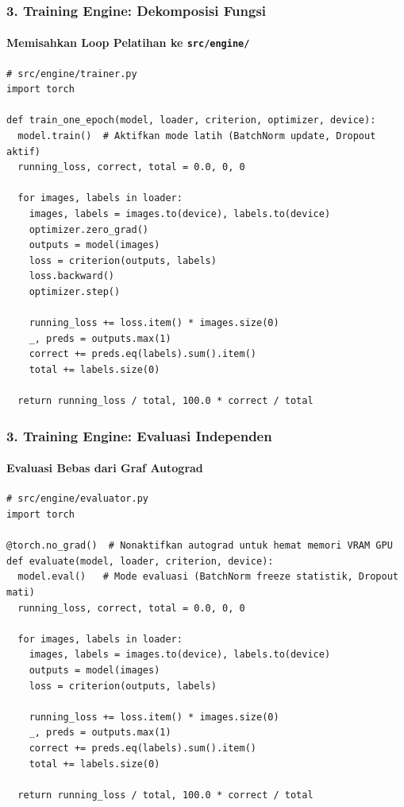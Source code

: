 \documentclass[t,aspectratio=169,xcolor=dvipsnames]{beamer}
\begin{document}
\begin{frame}[fragile]
  \frametitle{3. Training Engine: Dekomposisi Fungsi}
  \framesubtitle{Memisahkan Loop Pelatihan ke \texttt{src/engine/}}

\begin{lstlisting}[style=py]
# src/engine/trainer.py
import torch

def train_one_epoch(model, loader, criterion, optimizer, device):
  model.train()  # Aktifkan mode latih (BatchNorm update, Dropout aktif)
  running_loss, correct, total = 0.0, 0, 0

  for images, labels in loader:
    images, labels = images.to(device), labels.to(device)
    optimizer.zero_grad()
    outputs = model(images)
    loss = criterion(outputs, labels)
    loss.backward()
    optimizer.step()

    running_loss += loss.item() * images.size(0)
    _, preds = outputs.max(1)
    correct += preds.eq(labels).sum().item()
    total += labels.size(0)

  return running_loss / total, 100.0 * correct / total
\end{lstlisting}
\end{frame}

\begin{frame}[fragile]
  \frametitle{3. Training Engine: Evaluasi Independen}
  \framesubtitle{Evaluasi Bebas dari Graf Autograd}

\begin{lstlisting}[style=py]
# src/engine/evaluator.py
import torch

@torch.no_grad()  # Nonaktifkan autograd untuk hemat memori VRAM GPU
def evaluate(model, loader, criterion, device):
  model.eval()   # Mode evaluasi (BatchNorm freeze statistik, Dropout mati)
  running_loss, correct, total = 0.0, 0, 0

  for images, labels in loader:
    images, labels = images.to(device), labels.to(device)
    outputs = model(images)
    loss = criterion(outputs, labels)

    running_loss += loss.item() * images.size(0)
    _, preds = outputs.max(1)
    correct += preds.eq(labels).sum().item()
    total += labels.size(0)

  return running_loss / total, 100.0 * correct / total
\end{lstlisting}
\end{frame}
\end{document}
